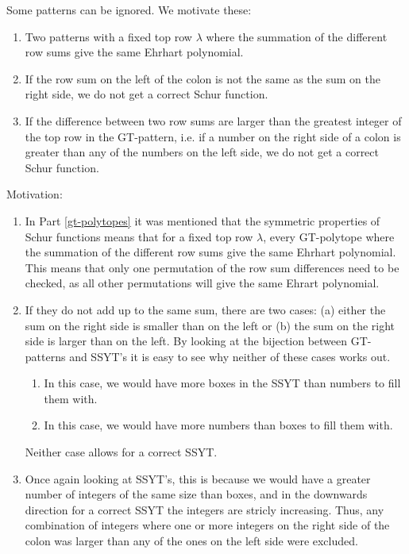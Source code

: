 	Some patterns can be ignored. We motivate these:
	
	\begin{enumerate}
		\item Two patterns with a fixed top row $\lambda$ where the summation of the 
		different row sums give the same Ehrhart polynomial.
		\item If the row sum on the left of the colon is not the same as the sum on 
		the right side, we do not get a correct Schur function.
		\item If the difference between two row sums are larger than the greatest 
		integer of the top row in the GT-pattern, i.e. if a number on the right side of a 
		colon is greater than any of the numbers on the left side, we do not get a correct 
		Schur function.
	\end{enumerate}
	Motivation:
	\begin{enumerate}
		\item In Part \ref{gt-polytopes} it was mentioned that the symmetric properties 
		of Schur functions means that for a fixed top row $\lambda$, 
		every GT-polytope where the summation of the different row sums give 
		the same Ehrhart polynomial. This means that only one permutation of the row sum 
		differences need to be checked, as all other permutations will give the same 
		Ehrart polynomial.
		
		\item 
		If they do not add up to the same sum, there are two cases: 
		(a) either the sum on the right side is smaller than on the left or 
		(b) the sum on the right side is larger than on the left. 
		By looking at the bijection between GT-patterns and SSYT's it is easy to see 
		why neither of these cases works out.
		\begin{enumerate}
			\item
			In this case, we would have more boxes in the SSYT than numbers to 
			fill them with. 
			\item In this case, we would have more numbers than boxes to fill them with. 
		\end{enumerate}
		Neither case allows for a correct SSYT. 
		
		\item Once again looking at SSYT's, this is because we would have a greater 
		number of integers of the same size than boxes, and in the downwards direction 
		for a correct SSYT the integers are stricly increasing. Thus, 
		any combination of integers where one or more integers on the right side of 
		the colon was larger than any of the ones on the left side were excluded.
	\end{enumerate} 
	
